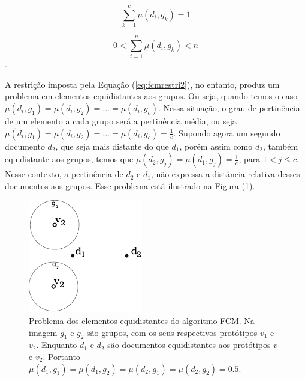 \begin{equation} \sum_{k=1}^c
\mu(d_i,g_k) = 1 \label{eq:fcmrestri1} 
\end{equation}

\begin{equation} 0 < \sum_{i=1}^n
\mu(d_i,g_k) < n \label{eq:fcmrestri2} 
\end{equation}. 

A restrição imposta pela Equação (\ref{eq:fcmrestri2}), no entanto, produz um problema em elementos
equidistantes aos grupos. Ou seja, quando temos o caso $\mu(d_i, g_1) = \mu(d_i, g_2) = ... =
\mu(d_i, g_c)$. Nessa situação, o grau de pertinência de um elemento a cada grupo será a pertinência
média, ou seja $\mu(d_i, g_1) = \mu(d_i, g_2) = ... = \mu(d_i, g_c) = \frac{1}{c}$. Supondo agora um
segundo documento $d_2$, que seja mais distante do que $d_1$, porém assim como $d_2$, também
equidistante aos grupos, temos que $\mu(d_2, g_j) = \mu(d_1, g_j) = \frac{1}{c}$, para $1 < j \leq
c$. Nesse contexto, a pertinência de $d_2$ e $d_1$, não expressa a distância relativa desses
documentos aos grupos. Esse problema está ilustrado na Figura (\ref{fig:fcm_problem}).

\begin{figure}[!htp] \centering
  \includegraphics[width=0.4\columnwidth]{assets/clusters_fcm_problem.pdf} 
  \caption{Problema dos
    elementos equidistantes do algoritmo FCM. Na imagem $g_1$ e $g_2$ são grupos, com os seus
    respectivos protótipos $v_1$ e $v_2$. Enquanto $d_1$ e $d_2$ são documentos equidistantes aos
    protótipos $v_1$ e $v_2$. Portanto $\mu(d_1,g_1) = \mu(d_1,g_2) = \mu(d_2,g_1) = \mu(d_2,g_2) =
0.5$.} 
  \label{fig:fcm_problem} 
\end{figure}

